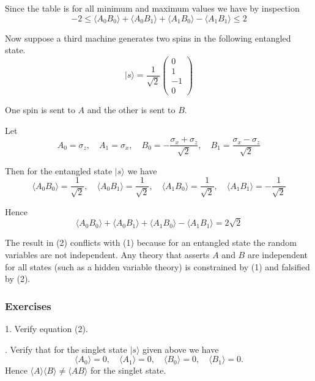 Since the table is for all minimum and maximum values we have by inspection
\begin{equation*}
-2\le \langle A_0B_0\rangle+\langle A_0B_1\rangle+\langle A_1B_0\rangle-\langle A_1B_1\rangle\le2
\tag{1}
\end{equation*}

Now suppose a third machine generates two spins in the following entangled state.
\begin{equation*}
|s\rangle=\frac{1}{\sqrt2}\begin{pmatrix}0\\1\\-1\\0\end{pmatrix}
\end{equation*}

One spin is sent to $A$ and the other is sent to $B$.

\bigskip
Let
\begin{equation*}
A_0=\sigma_z,\quad
A_1=\sigma_x,\quad
B_0=-\frac{\sigma_x+\sigma_z}{\sqrt2},\quad
B_1=\frac{\sigma_x-\sigma_z}{\sqrt2}
\end{equation*}

Then for the entangled state $|s\rangle$ we have
\begin{equation*}
\langle A_0B_0\rangle=\frac{1}{\sqrt2},\quad
\langle A_0B_1\rangle=\frac{1}{\sqrt2},\quad
\langle A_1B_0\rangle=\frac{1}{\sqrt2},\quad
\langle A_1B_1\rangle=-\frac{1}{\sqrt2}
\end{equation*}

Hence
\begin{equation*}
\langle A_0B_0\rangle+
\langle A_0B_1\rangle+
\langle A_1B_0\rangle-
\langle A_1B_1\rangle=2\sqrt2
\tag{2}
\end{equation*}

The result in (2) conflicts with (1) because for an entangled state
the random variables are not independent.
Any theory that asserts $A$ and $B$ are independent for all states
(such as a hidden variable theory)
is constrained by (1) and falsified by (2).

\subsubsection*{Exercises}

1. Verify equation (2).

. Verify that for the singlet state $|s\rangle$ given above we have
\begin{equation*}
\langle A_0\rangle=0,\quad\langle A_1\rangle=0,\quad\langle B_0\rangle=0,\quad\langle B_1\rangle=0.
\end{equation*}
Hence $\langle A\rangle\langle B\rangle\ne\langle AB\rangle$ for the singlet state.

